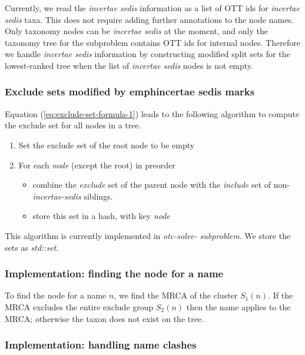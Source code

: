 \documentclass[english]{article}
\begin{document}
Currently, we read the \emph{incertae sedis} information as a list of
OTT ids for \emph{incertae sedis} taxa. This does not require adding
further annotations to the node names. Only taxonomy nodes can be
\emph{incertae sedis} at the moment, and only the taxonomy tree for
the subproblem contains OTT ids for internal nodes. Therefore we
handle \emph{incertae sedis} information by constructing modified
split sets for the lowest-ranked tree when the list of \emph{incertae
sedis} nodes is not empty.

\subsubsection{Exclude sets modified by emph{incertae sedis} marks}

Equation (\ref{eq:exclude-set-formula-1}) leads to the following
algorithm to compute the exclude set for all nodes in a tree.
\begin{enumerate} \item Set the exclude set of the root node to be
empty \item For each \emph{node} (except the root) in preorder
\begin{itemize} \item combine the \emph{exclude} set of the parent
node with the \emph{include} set of non-\emph{incertae-sedis}
siblings. \item store this set in a hash, with key \emph{node}
\end{itemize} \end{enumerate} This algorithm is currently implemented
in \emph{otc-solve- subproblem}. We store the sets as \emph{std::set}.

\subsubsection{Implementation: finding the node for a name}

To find the node for a name $n$, we find the MRCA of the cluster
$S_{1}(n)$. If the MRCA excludes the entire exclude group $S_{2}(n)$
then the name applies to the MRCA; otherwise the taxon does not exist
on the tree.

\subsubsection{Implementation: handling name clashes}
\end{document}
